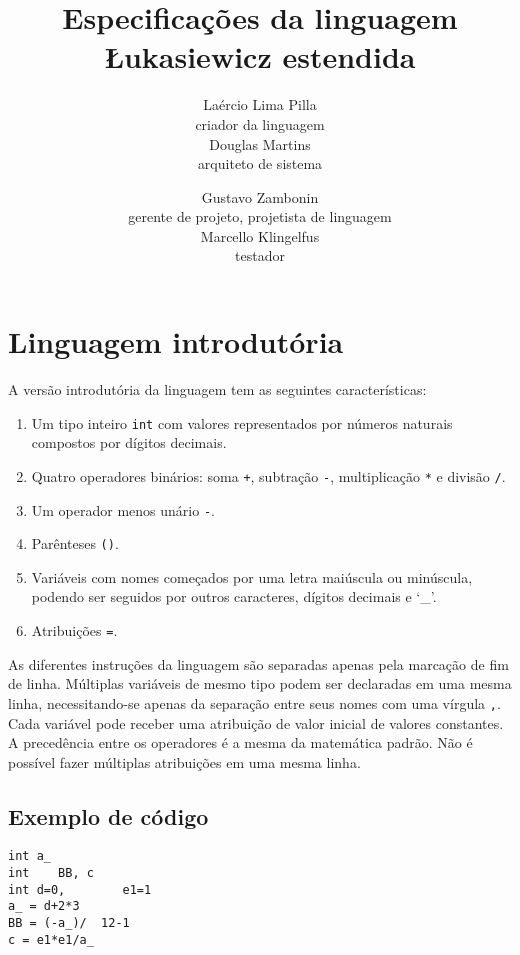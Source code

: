 \documentclass{sftex/sftex}
\title{Especificações da linguagem Łukasiewicz estendida}
\author{
    Laércio Lima Pilla \\
    {\small criador da linguagem} \vspace{3mm} \\
    Douglas Martins \\
    {\small arquiteto de sistema} \vspace{3mm} \\
    \and Gustavo Zambonin \\
    {\small gerente de projeto, projetista de linguagem} \vspace{3mm} \\
    Marcello Klingelfus \\
    {\small testador} \vspace{3mm} \\
}
\newenvironment{smallenum}{
    \vspace{-1mm}
    \begin{enumerate}[label=\roman*.]
    \setlength{\parskip}{0pt}
    \setlength{\itemsep}{2pt}
}{
    \vspace{-2mm}
    \end{enumerate}
}
\begin{document}
\maketitle

\tableofcontents

\newpage

\section{Linguagem introdutória}

A versão introdutória da linguagem tem as seguintes características:

\begin{smallenum}

\item Um tipo inteiro \verb!int! com valores representados por números
    naturais compostos por dígitos decimais.

\item Quatro operadores binários: soma \verb!+!, subtração \verb!-!,
    multiplicação \verb!*! e divisão \verb!/!.

\item Um operador menos unário \verb!-!.

\item Parênteses \verb!()!.

\item Variáveis com nomes começados por uma letra maiúscula ou minúscula,
    podendo ser seguidos por outros caracteres, dígitos decimais e ‘\_’.

\item Atribuições \verb!=!.

\end{smallenum}

As diferentes instruções da linguagem são separadas apenas pela marcação de
fim de linha. Múltiplas variáveis de mesmo tipo podem ser declaradas em uma
mesma linha, necessitando-se apenas da separação entre seus nomes com uma
vírgula \verb!,!. Cada variável pode receber uma atribuição de valor inicial
de valores constantes. A precedência entre os operadores é a mesma da
matemática padrão. Não é possível fazer múltiplas atribuições em uma mesma
linha.

\subsection{Exemplo de código}

\begin{verbatim}
int a_
int    BB, c
int d=0,        e1=1
a_ = d+2*3
BB = (-a_)/  12-1
c = e1*e1/a_
\end{verbatim}
\end{document}
